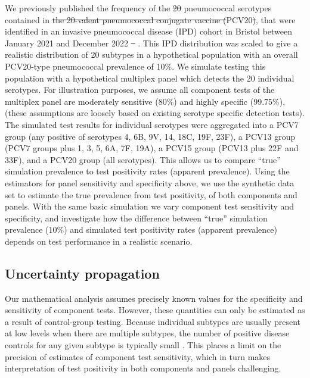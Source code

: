 \documentclass[10pt,letterpaper]{article}
\providecommand{\DIFaddtex}[1]{{\protect\color{blue}\uwave{#1}}} %
\providecommand{\DIFdeltex}[1]{{\protect\color{red}\sout{#1}}}                      %
\providecommand{\DIFaddbegin}{} %
\providecommand{\DIFaddend}{} %
\providecommand{\DIFdelbegin}{} %
\providecommand{\DIFdelend}{} %
\providecommand{\DIFadd}[1]{\texorpdfstring{\DIFaddtex{#1}}{#1}} %
\providecommand{\DIFdel}[1]{\texorpdfstring{\DIFdeltex{#1}}{}} %
\newcommand{\DIFscaledelfig}{0.5}
\newlength{\DIFdelgraphicswidth} %
\newlength{\DIFdelgraphicsheight} %
\newcommand{\DIFaddincludegraphics}[2][]{{\color{blue}\fbox{\DIFOincludegraphics[#1]{#2}}}} %
\newcommand{\DIFdelincludegraphics}[2][]{%
\sbox{\DIFdelgraphicsbox}{\DIFOincludegraphics[#1]{#2}}%
\settoboxwidth{\DIFdelgraphicswidth}{\DIFdelgraphicsbox} %
\settoboxtotalheight{\DIFdelgraphicsheight}{\DIFdelgraphicsbox} %
\scalebox{\DIFscaledelfig}{%
\parbox[b]{\DIFdelgraphicswidth}{\usebox{\DIFdelgraphicsbox}\\[-\baselineskip] \rule{\DIFdelgraphicswidth}{0em}}\llap{\resizebox{\DIFdelgraphicswidth}{\DIFdelgraphicsheight}{%
\setlength{\unitlength}{\DIFdelgraphicswidth}%
\begin{picture}(1,1)%
\thicklines\linethickness{2pt} %
{\color[rgb]{1,0,0}\put(0,0){\framebox(1,1){}}}%
{\color[rgb]{1,0,0}\put(0,0){\line( 1,1){1}}}%
{\color[rgb]{1,0,0}\put(0,1){\line(1,-1){1}}}%
\end{picture}%
}\hspace*{3pt}}} %
} %
\DeclareRobustCommand{\DIFaddbegin}{\DIFOaddbegin \let\includegraphics\DIFaddincludegraphics} %
\DeclareRobustCommand{\DIFaddend}{\DIFOaddend \let\includegraphics\DIFOincludegraphics} %
\DeclareRobustCommand{\DIFdelbegin}{\DIFOdelbegin \let\includegraphics\DIFdelincludegraphics} %
\DeclareRobustCommand{\DIFdelend}{\DIFOaddend \let\includegraphics\DIFOincludegraphics} %
\begin{document}
We previously published the frequency of the \DIFdelbegin \DIFdel{20 }\DIFdelend pneumococcal serotypes contained in \DIFdelbegin \DIFdel{the 20-valent pneumococcal conjugate vaccine (}\DIFdelend PCV20\DIFdelbegin \DIFdel{)}\DIFdelend , that were identified in an invasive pneumococcal disease (IPD) cohort in Bristol between January 2021 and December 2022 \DIFdelbegin \DIFdel{\mbox{%
\cite{hyams2023a}}\hspace{0pt}%
}\DIFdelend \DIFaddbegin \DIFadd{\mbox{%
\cite{hyams2023}}\hspace{0pt}%
}\DIFaddend . This IPD distribution was scaled to give a realistic distribution of 20 subtypes in a hypothetical population with an overall PCV20-type pneumococcal prevalence of 10\%. We simulate testing this population with a hypothetical multiplex panel which detects the 20 individual serotypes. For illustration purposes, we assume all component tests of the multiplex panel are moderately sensitive (80\%) and highly specific (99.75\%), (these assumptions are loosely based on existing serotype specific detection tests). The simulated test results for individual serotypes were aggregated into a PCV7 group (any positive of serotypes 4, 6B, 9V, 14, 18C, 19F, 23F), a PCV13 group (PCV7 groups plus 1, 3, 5, 6A, 7F, 19A), a PCV15 group (PCV13 plus 22F and 33F), and a PCV20 group (all serotypes). This allows us to compare ``true'' simulation prevalence to test positivity rates (apparent prevalence). Using the estimators for panel sensitivity and specificity above, we use the synthetic data set to estimate the true prevalence from test positivity, of both components and panels. With the same basic simulation we vary component test sensitivity and specificity, and investigate how the difference between ``true'' simulation prevalence (10\%) and simulated test positivity rates (apparent prevalence) depends on test performance in a realistic scenario.

\subsection*{Uncertainty propagation}

Our mathematical analysis assumes precisely known values for the specificity and sensitivity of component tests. However, these quantities can only be estimated as a result of control-group testing. Because individual subtypes are usually present at low levels when there are multiple subtypes, the number of positive disease controls for any given subtype is typically small \cite{bonten2015}. This places a limit on the precision of estimates of component test sensitivity, which in turn makes interpretation of test positivity in both components and panels challenging.
\end{document}
